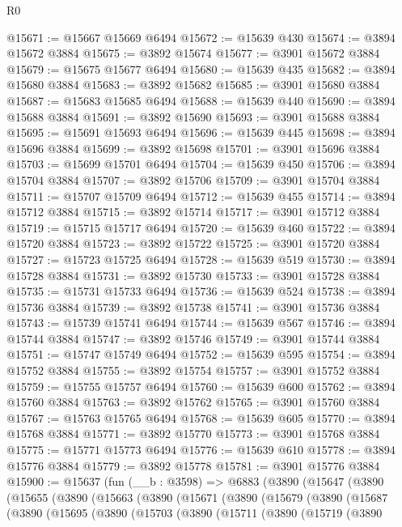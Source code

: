 \begin{lexlean}{R0}
\begin{coremodule}
@15671 := @15667 @15669 @6494
@15672 := @15639 @430
@15674 := @3894 @15672 @3884
@15675 := @3892 @15674
@15677 := @3901 @15672 @3884
@15679 := @15675 @15677 @6494
@15680 := @15639 @435
@15682 := @3894 @15680 @3884
@15683 := @3892 @15682
@15685 := @3901 @15680 @3884
@15687 := @15683 @15685 @6494
@15688 := @15639 @440
@15690 := @3894 @15688 @3884
@15691 := @3892 @15690
@15693 := @3901 @15688 @3884
@15695 := @15691 @15693 @6494
@15696 := @15639 @445
@15698 := @3894 @15696 @3884
@15699 := @3892 @15698
@15701 := @3901 @15696 @3884
@15703 := @15699 @15701 @6494
@15704 := @15639 @450
@15706 := @3894 @15704 @3884
@15707 := @3892 @15706
@15709 := @3901 @15704 @3884
@15711 := @15707 @15709 @6494
@15712 := @15639 @455
@15714 := @3894 @15712 @3884
@15715 := @3892 @15714
@15717 := @3901 @15712 @3884
@15719 := @15715 @15717 @6494
@15720 := @15639 @460
@15722 := @3894 @15720 @3884
@15723 := @3892 @15722
@15725 := @3901 @15720 @3884
@15727 := @15723 @15725 @6494
@15728 := @15639 @519
@15730 := @3894 @15728 @3884
@15731 := @3892 @15730
@15733 := @3901 @15728 @3884
@15735 := @15731 @15733 @6494
@15736 := @15639 @524
@15738 := @3894 @15736 @3884
@15739 := @3892 @15738
@15741 := @3901 @15736 @3884
@15743 := @15739 @15741 @6494
@15744 := @15639 @567
@15746 := @3894 @15744 @3884
@15747 := @3892 @15746
@15749 := @3901 @15744 @3884
@15751 := @15747 @15749 @6494
@15752 := @15639 @595
@15754 := @3894 @15752 @3884
@15755 := @3892 @15754
@15757 := @3901 @15752 @3884
@15759 := @15755 @15757 @6494
@15760 := @15639 @600
@15762 := @3894 @15760 @3884
@15763 := @3892 @15762
@15765 := @3901 @15760 @3884
@15767 := @15763 @15765 @6494
@15768 := @15639 @605
@15770 := @3894 @15768 @3884
@15771 := @3892 @15770
@15773 := @3901 @15768 @3884
@15775 := @15771 @15773 @6494
@15776 := @15639 @610
@15778 := @3894 @15776 @3884
@15779 := @3892 @15778
@15781 := @3901 @15776 @3884
@15900 := @15637
    (fun (__b : @3598) =>
    @6883
      (@3890
        (@15647
          (@3890
            (@15655
              (@3890
                (@15663
                  (@3890
                    (@15671
                      (@3890
                        (@15679
                          (@3890
                            (@15687
                              (@3890
                                (@15695
                                  (@3890
                                    (@15703
                                      (@3890
                                        (@15711
                                          (@3890
                                            (@15719
                                              (@3890

\end{coremodule}
\end{lexlean}
